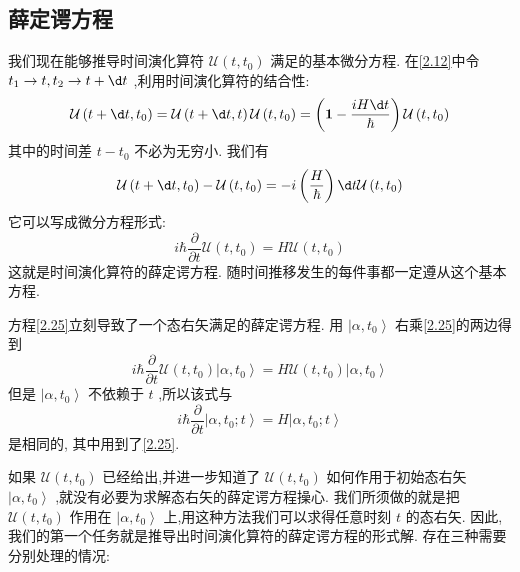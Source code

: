 \documentclass[lang=cn,newtx,10pt,scheme=chinese,thmcnt=section]{elegantbook}
\begin{document}
\subsection*{薛定谔方程}

我们现在能够推导时间演化算符 $\mathcal{U}\left( {t,{t}_{0}}\right)$ 满足的基本微分方程. 在\ref{2.12}中令 ${t}_{1} \rightarrow t,{t}_{2} \rightarrow t + {\d t}$ ,利用时间演化算符的结合性:
\begin{equation}
	\mathcal{U}\left( {t + {\d t},{t}_{0}}\right) = \mathcal{U}\left( {t + {\d t}, t}\right) \mathcal{U}\left( {t,{t}_{0}}\right) = \left( {\textbf{1} - \frac{iH\d t}{\hbar }}\right) \mathcal{U}\left( {t,{t}_{0}}\right)
\end{equation}
其中的时间差 $t - {t}_{0}$ 不必为无穷小. 我们有
\begin{equation}
	\mathcal{U}\left( {t + {\d t},{t}_{0}}\right) - \mathcal{U}\left( {t,{t}_{0}}\right) = - i\left( \frac{H}{\hbar }\right) {\d t}\mathcal{U}\left( {t,{t}_{0}}\right)
\end{equation}
它可以写成微分方程形式:
\begin{equation}\label{2.25}
	i\hbar \frac{\partial }{\partial t}\mathcal{U}\left( {t,{t}_{0}}\right) = {H\mathcal{U}}\left( {t,{t}_{0}}\right)
\end{equation}
这就是时间演化算符的薛定谔方程. 随时间推移发生的每件事都一定遵从这个基本方程.

方程\ref{2.25}立刻导致了一个态右矢满足的薛定谔方程. 用 $\left| {\alpha ,{t}_{0}}\right\rangle$ 右乘\ref{2.25}的两边得到
\begin{equation}
	i\hbar \frac{\partial }{\partial t}\mathcal{U}\left( {t,{t}_{0}}\right) \left| {\alpha ,{t}_{0}}\right\rangle = {H\mathcal{U}}\left( {t,{t}_{0}}\right) \left| {\alpha ,{t}_{0}}\right\rangle
\end{equation}
但是 $\left| {\alpha ,{t}_{0}}\right\rangle$ 不依赖于 $t$ ,所以该式与
\begin{equation}\label{2.27}
	i\hbar \frac{\partial }{\partial t}\left| {\alpha ,{t}_{0};t}\right\rangle = H\left| {\alpha ,{t}_{0};t}\right\rangle
\end{equation}
是相同的, 其中用到了\ref{2.25}.

如果 $\mathcal{U}\left( {t,{t}_{0}}\right)$ 已经给出,并进一步知道了 $\mathcal{U}\left( {t,{t}_{0}}\right)$ 如何作用于初始态右矢 $\left| {\alpha ,{t}_{0}}\right\rangle$ ,就没有必要为求解态右矢的薛定谔方程操心. 我们所须做的就是把 $\mathcal{U}\left( {t,{t}_{0}}\right)$ 作用在 $\left| {\alpha ,{t}_{0}}\right\rangle$ 上,用这种方法我们可以求得任意时刻 $t$ 的态右矢. 因此,我们的第一个任务就是推导出时间演化算符的薛定谔方程的形式解. 存在三种需要分别处理的情况:
\end{document}
